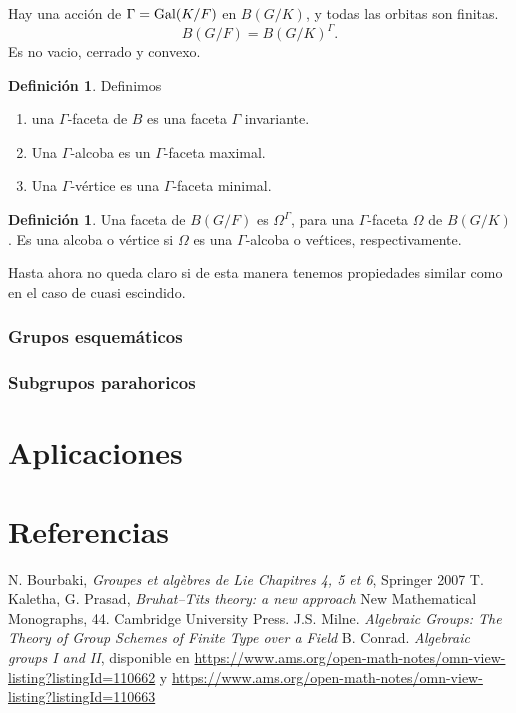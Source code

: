 \documentclass[oneside,12pt]{amsart}
\theoremstyle{definition}
\newtheorem{defi}[theorem]{Definición}
\numberwithin{equation}{section}
\begin{document}
Hay una acci\'on de $\Gamma={\rm Gal}(K/F)$ en $B(G/K)$, y todas las orbitas son finitas.
\[B(G/F)=B(G/K)^{\Gamma}.\]
Es no vacio, cerrado y convexo.
\begin{defi}Definimos
    \begin{enumerate}
        \item una $\Gamma$-faceta de $B$ es una faceta $\Gamma$ invariante.
        \item Una $\Gamma$-alcoba es un $\Gamma$-faceta maximal.
        \item Una $\Gamma$-v\'ertice es una $\Gamma$-faceta minimal.
\end{enumerate}
\end{defi}

\begin{defi}
    Una faceta de $B(G/F)$ es $\Omega^\Gamma$, para una $\Gamma$-faceta $\Omega$ de $B(G/K)$. Es una alcoba o v\'ertice si $\Omega$ es  una $\Gamma$-alcoba o ve\'rtices, respectivamente.
\end{defi}


Hasta ahora no queda claro si de esta manera tenemos propiedades similar como en el caso de cuasi escindido.

\subsubsection*{Grupos esquem\'aticos}
\subsubsection*{Subgrupos parahoricos}


\section{Aplicaciones}


\section*{Referencias}
\begin{thebibliography}{99}
     N. Bourbaki, \emph{Groupes et algèbres de Lie
    Chapitres 4, 5 et 6}, Springer 2007
    T. Kaletha, G. Prasad, \emph{Bruhat–Tits theory: a new approach}
    New Mathematical Monographs, 44. Cambridge University Press.
     J.S. Milne. \emph{Algebraic Groups: The Theory of Group Schemes of Finite Type over a Field}
    B. Conrad. \emph{Algebraic groups I and II},
    disponible en \href{https://www.ams.org/open-math-notes/omn-view-listing?listingId=110662}{https://www.ams.org/open-math-notes/omn-view-listing?listingId=110662} y 
    \href{https://www.ams.org/open-math-notes/omn-view-listing?listingId=110663}{https://www.ams.org/open-math-notes/omn-view-listing?listingId=110663}
\end{thebibliography}
    
\end{document}
